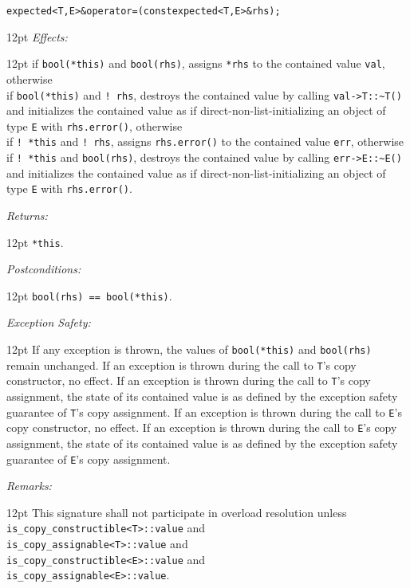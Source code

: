 \documentclass[a4paper,10pt]{article}
\newcommand{\cpp}[1]{\lstinline{#1}}
\newcommand{\wordingItem}[1]{\noindent\textit{#1:}}
\newenvironment{wordingTextItem}[1]{\wordingItem{#1}\vspace{2pt}\noindent\begin{adjustwidth}{12pt}{}}{\vspace{2pt}\end{adjustwidth}}
\newenvironment{wordingPara}{\begin{adjustwidth}{12pt}{}}{\end{adjustwidth}}
\begin{document}
\begin{alltt}
expected<T,E>& operator=(const expected<T,E>& rhs); 
\end{alltt}
\begin{wordingPara}
\begin{wordingTextItem}{Effects}
if \cpp{bool(*this)} and \cpp{bool(rhs)}, assigns \cpp{*rhs} to the contained value \cpp{val}, otherwise \\
if \cpp{bool(*this)} and \cpp{! rhs}, destroys the contained value by calling \cpp{val->T::~T()} and  initializes the contained value as if direct-non-list-initializing an object of type \cpp{E} with \cpp{rhs.error()}, otherwise \\
if \cpp{! *this} and \cpp{! rhs}, assigns \cpp{rhs.error()} to the contained value \cpp{err}, otherwise \\
if \cpp{! *this} and \cpp{bool(rhs)}, destroys the contained value by calling \cpp{err->E::~E()} and  initializes the contained value as if direct-non-list-initializing an object of type \cpp{E} with \cpp{rhs.error()}.
\end{wordingTextItem}
\begin{wordingTextItem}{Returns}
\cpp{*this}.
\end{wordingTextItem}
\begin{wordingTextItem}{Postconditions}
\cpp{bool(rhs) == bool(*this)}.
\end{wordingTextItem}
\begin{wordingTextItem}{Exception Safety}
If any exception is thrown, the values of \cpp{bool(*this)} and \cpp{bool(rhs)} remain unchanged. If an exception is thrown during the call to \cpp{T}'s copy constructor, no effect. If an exception is thrown during the call to \cpp{T}'s copy assignment, the state of its contained value is as defined by the exception safety guarantee of \cpp{T}'s copy assignment. If an exception is thrown during the call to \cpp{E}'s copy constructor, no effect. If an exception is thrown during the call to \cpp{E}'s copy assignment, the state of its contained value is as defined by the exception safety guarantee of \cpp{E}'s copy assignment.
\end{wordingTextItem}
\begin{wordingTextItem}{Remarks}
This signature shall not participate in overload resolution unless\\
\cpp{is_copy_constructible<T>::value} and\\
\cpp{is_copy_assignable<T>::value} and\\
\cpp{is_copy_constructible<E>::value} and\\
\cpp{is_copy_assignable<E>::value}.
\end{wordingTextItem}

\end{wordingPara}
\end{document}
